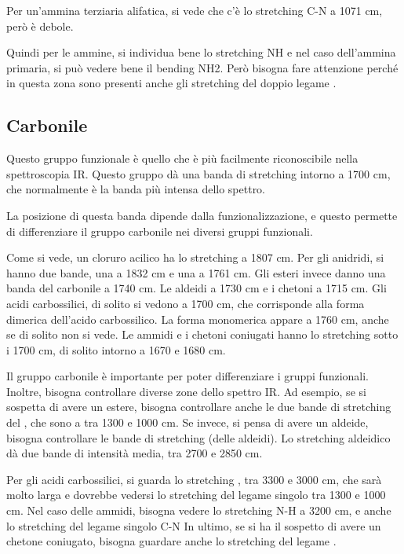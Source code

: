 Per un'ammina terziaria alifatica, si vede che c'è lo stretching C-N a
1071 cm, però è debole.

Quindi per le ammine, si individua bene lo stretching NH e nel caso
dell'ammina primaria, si può vedere bene il bending NH2. Però bisogna
fare attenzione perché in questa zona sono presenti anche gli stretching
del doppio legame .

\subsection{Carbonile}

Questo gruppo funzionale è quello che è più facilmente riconoscibile
nella spettroscopia IR. Questo gruppo dà una banda di stretching 
intorno a 1700 cm, che normalmente è la banda più intensa dello spettro.

La posizione di questa banda dipende dalla funzionalizzazione, e questo
permette di differenziare il gruppo carbonile nei diversi gruppi
funzionali.

Come si vede, un cloruro acilico ha lo stretching  a 1807 cm. Per
gli anidridi, si hanno due bande, una a 1832 cm e una a 1761 cm.
Gli esteri invece danno una banda del carbonile a 1740 cm. Le aldeidi
a 1730 cm e i chetoni a 1715 cm.
Gli acidi carbossilici, di solito si vedono a 1700 cm, che corrisponde
alla forma dimerica dell'acido carbossilico. La forma monomerica appare
a 1760 cm, anche se di solito non si vede.
Le ammidi e i chetoni coniugati hanno lo stretching  sotto i 1700
cm, di solito intorno a 1670 e 1680 cm.

Il gruppo carbonile è importante per poter differenziare i gruppi
funzionali. Inoltre, bisogna controllare diverse zone dello spettro IR.
Ad esempio, se si sospetta di avere un estere, bisogna controllare anche
le due bande di stretching del , che sono a tra 1300 e 1000 cm.
Se invece, si pensa di avere un aldeide, bisogna controllare le bande di
stretching  (delle aldeidi). Lo stretching  aldeidico dà due bande
di intensità media, tra 2700 e 2850 cm.

Per gli acidi carbossilici, si guarda lo stretching , tra 3300 e 3000
cm, che sarà molto larga e dovrebbe vedersi lo stretching del legame
singolo  tra 1300 e 1000 cm.
Nel caso delle ammidi, bisogna vedere lo stretching N-H a 3200 cm, e
anche lo stretching del legame singolo C-N
In ultimo, se si ha il sospetto di avere un chetone coniugato, bisogna
guardare anche lo stretching del legame .

